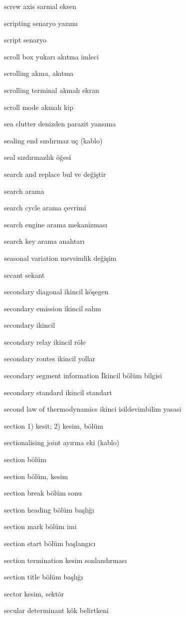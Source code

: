 \documentclass[12pt,fleqn]{article}\usepackage{../../common}
\begin{document}
screw axis sarmal eksen

scripting senaryo yazımı

script senaryo

scroll box yukarı akıtma imleci

scrolling akma, akıtma

scrolling terminal akmalı ekran

scroll mode akmalı kip

sea clutter denizden parazit yansıma

sealing end sızdırmaz uç (kablo)

seal sızdırmazlık öğesi

search and replace bul ve değiştir

search arama

search cycle arama çevrimi

search engine arama mekanizması

search key arama anahtarı

seasonal variation mevsimlik değişim

secant sekant

secondary diagonal ikincil köşegen

secondary emission ikincil salım

secondary ikincil

secondary relay ikincil röle

secondary routes ikincil yollar

secondary segment information İkincil bölüm bilgisi

secondary standard ikincil standart

second law of thermodynamics ikinci isildevimbilim yasasi

section 1) kesit; 2) kesim, bölüm

sectionalising joint ayırma eki (kablo)

section bölüm

section bölüm, kesim

section break bölüm sonu

section heading bölüm başlığı

section mark bölüm imi

section start bölüm başlangıcı

section termination kesim sonlandırması

section title bölüm başlığı

sector kesim, sektör

secular determinant kök belirtkeni
\end{document}
